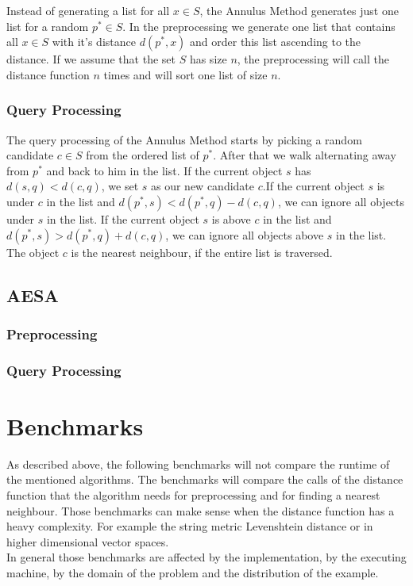\documentclass[runningheads,a4paper]{llncs}
\begin{document}
Instead of generating a list for all $x \in S$, the Annulus Method generates just one list for a random $p^* \in S$. In
the preprocessing we generate one list that contains all $x \in S$ with it's distance $d(p^*, x)$ and order this list
ascending to the distance. If we assume that the set $S$ has size $n$, the preprocessing will call the distance function
$n$ times and will sort one list of size $n$.

\subsubsection{Query Processing}

The query processing of the Annulus Method starts by picking a random candidate $c \in S$ from the ordered list of
$p^*$. After that we walk alternating away from $p^*$ and back to him in the list. If the current object $s$ has
$d(s, q) < d(c, q)$, we set $s$ as our new candidate $c$.If the current object $s$ is under $c$ in the list and
$d(p^*, s) < d(p^*, q) - d(c, q)$, we can ignore all objects under $s$ in the list. If the current object $s$ is above
$c$ in the list and $d(p^*, s) > d(p^*, q) + d(c, q)$, we can ignore all objects above $s$ in the list. The object $c$
is the nearest neighbour, if the entire list is traversed.

\subsection{AESA}

\subsubsection{Preprocessing}

\subsubsection{Query Processing}

\section{Benchmarks}

As described above, the following benchmarks will not compare the runtime of the mentioned algorithms. The benchmarks
will compare the calls of the distance function that the algorithm needs for preprocessing and for finding a nearest
neighbour. Those benchmarks can make sense when the distance function has a heavy complexity. For example the string
metric Levenshtein distance or in higher dimensional vector spaces.\\
In general those benchmarks are affected by the implementation, by the executing machine, by the domain of the problem
and the distribution of the example.
\end{document}
